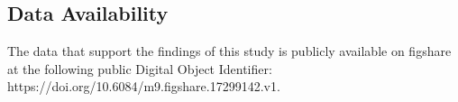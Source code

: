 \subsection{Data Availability}
\label{sec:ap1:m13}
The data that support the findings of this study is publicly available on figshare at the following public Digital Object Identifier: https://doi.org/10.6084/m9.figshare.17299142.v1. 